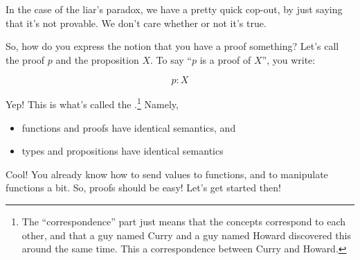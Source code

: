In the case of the liar's paradox, we have a pretty quick cop-out, by just
saying that it's not provable. We don't care whether or not it's true.

So, how do you express the notion that you have a proof something? Let's call
the proof $p$ and the proposition $X$. To say ``$p$ is a proof of $X$'', you
write:

\begin{equation}
    p : X
\end{equation}


Yep! This is what's called the .\footnote{The
  ``correspondence'' part just means that the concepts correspond to each other,
  and that a guy named Curry and a guy named Howard discovered this around the
  same time. This  a correspondence between Curry and Howard.}
Namely,

\begin{itemize}
  \item functions and proofs have identical semantics, and
  \item types and propositions have identical semantics
\end{itemize}

Cool! You already know how to send values to functions, and to manipulate
functions a bit. So, proofs should be easy! Let's get started then!






